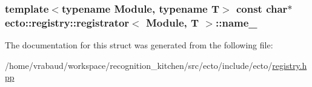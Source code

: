 \subsubsection[{\texorpdfstring{name\+\_\+}{name_}}]{\setlength{\rightskip}{0pt plus 5cm}template$<$typename Module, typename T$>$ const char$\ast$ {\bf ecto\+::registry\+::registrator}$<$ Module, T $>$\+::name\+\_\+}\hypertarget{structecto_1_1registry_1_1registrator_a794acc964cefc0a374129823b4ee5246}{}\label{structecto_1_1registry_1_1registrator_a794acc964cefc0a374129823b4ee5246}


The documentation for this struct was generated from the following file\+:\begin{DoxyCompactItemize}
\item 
/home/vrabaud/workspace/recognition\+\_\+kitchen/src/ecto/include/ecto/\hyperlink{registry_8hpp}{registry.\+hpp}\end{DoxyCompactItemize}
